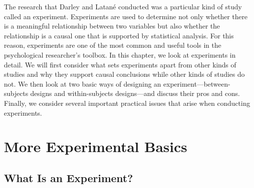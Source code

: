 The research that Darley and Latan\'e conducted was a particular kind of study called an experiment. Experiments are used to determine not only whether there is a meaningful relationship between two variables but also whether the relationship is a causal one that is supported by statistical analysis. For this reason, experiments are one of the most common and useful tools in the psychological researcher's toolbox. In this chapter, we look at experiments in detail. We will first consider what sets experiments apart from other kinds of studies and why they support causal conclusions while other kinds of studies do not. We then look at two basic ways of designing an experiment---between-subjects designs and within-subjects designs---and discuss their pros and cons. Finally, we consider several important practical issues that arise when conducting experiments.

\section{More Experimental Basics}
 

 \subsection{What Is an Experiment?}
 
